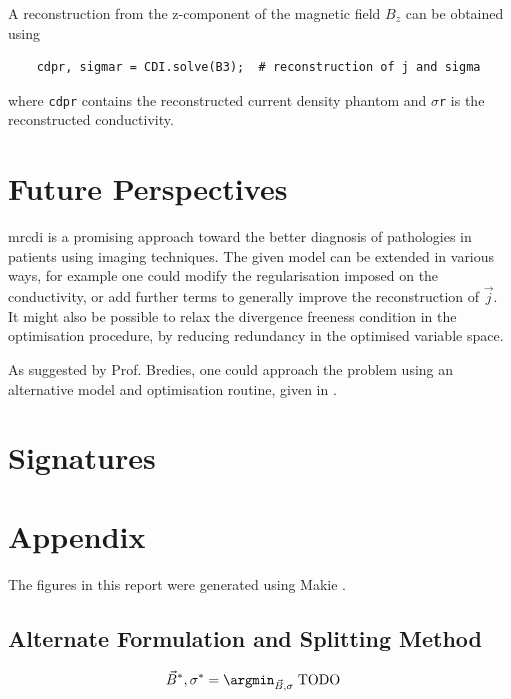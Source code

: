\documentclass[10pt]{article}
\begin{document}
  A reconstruction from the z-component of the magnetic field $B_z$ can be obtained using
  \begin{verbatim}
    cdpr, sigmar = CDI.solve(B3);  # reconstruction of j and sigma
  \end{verbatim}
  where \texttt{cdpr} contains the reconstructed current density phantom and $\sigma$\texttt{r} is the reconstructed conductivity.

  \section{Future Perspectives}
  \gls{mrcdi} is a promising approach toward the better diagnosis of pathologies in patients using imaging techniques.
  The given model can be extended in various ways, for example one could modify the regularisation imposed on the conductivity, or add further terms to generally improve the reconstruction of $\vec{j}$.
  It might also be possible to relax the divergence freeness condition in the optimisation procedure, by reducing redundancy in the optimised variable space.

  As suggested by Prof. Bredies, one could approach the problem using an alternative model and optimisation routine, given in .

  \section*{Signatures}

  \vspace{4cm}

  \vspace{3cm}

  \pagebreak
  \printbibliography
  \printnoidxglossary[type=acronym, title={Acronyms}]

  \pagebreak
  \appendix
  \section{Appendix}
  The figures in this report were generated using Makie \parencite{2021-makie}.

  \subsection{Alternate Formulation and Splitting Method}
  \label{sec:alt-formulation}
  \begin{align*}
    \vec{B}^*, \sigma^* & = \argmin_{\vec{B}, \sigma} \; \text{TODO}
  \end{align*}
\end{document}
